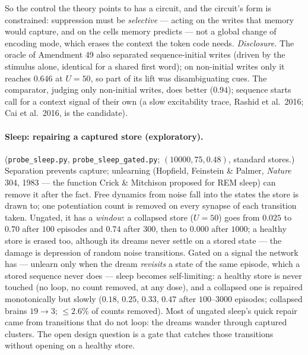 \documentclass[11pt]{article}
\theoremstyle{definition}
\theoremstyle{plain}
\begin{document}
So the control the theory points to has a circuit, and the circuit's form is
constrained: suppression must be \emph{selective} --- acting on the writes that
memory would capture, and on the cells memory predicts --- not a global change
of encoding mode, which erases the context the token code needs.
\emph{Disclosure.} The oracle of Amendment 49 also separated sequence-initial
writes (driven by the stimulus alone, identical for a shared first word); on
non-initial writes only it reaches $0.646$ at $U = 50$, so part of its lift was
disambiguating cues. The comparator, judging only non-initial writes, does
better ($0.94$); sequence starts call for a context signal of their own (a
slow excitability trace, Rashid et al.\ 2016; Cai et al.\ 2016, is the candidate).

\paragraph{Sleep: repairing a captured store (exploratory).} (\texttt{probe\_sleep.py},
\texttt{probe\_sleep\_gated.py}; $(10000,75,0.48)$, standard stores.) Separation
prevents capture; unlearning (Hopfield, Feinstein \& Palmer, \emph{Nature} 304,
1983 --- the function Crick \& Mitchison proposed for REM sleep) can remove it
after the fact. Free dynamics from noise fall into the states the store is
drawn to; one potentiation count is removed on every synapse of each
transition taken. Ungated, it has a \emph{window}: a collapsed store ($U = 50$)
goes from $0.025$ to $0.70$ after $100$ episodes and $0.74$ after $300$, then to
$0.000$ after $1000$; a healthy store is erased too, although its dreams never
settle on a stored state --- the damage is depression of random noise
transitions. Gated on a signal the network has --- unlearn only when the dream
\emph{revisits} a state of the same episode, which a stored sequence never does
--- sleep becomes self-limiting: a healthy store is never touched (no loop, no
count removed, at any dose), and a collapsed one is repaired monotonically but
slowly ($0.18$, $0.25$, $0.33$, $0.47$ after $100$--$3000$ episodes; collapsed
brains $19 \to 3$; $\le 2.6\%$ of counts removed). Most of ungated sleep's quick
repair came from transitions that do not loop: the dreams wander through
captured clusters. The open design question is a gate that catches those
transitions without opening on a healthy store.
\end{document}
